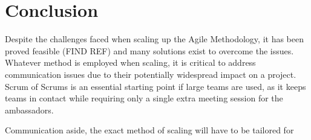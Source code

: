 \documentclass{scrartcl}
\begin{document}
\section{Conclusion}

Despite the challenges faced when scaling up the Agile Methodology, it has been proved feasible (FIND REF) and many solutions exist to overcome the issues. Whatever method is employed when scaling, it is critical to address communication issues due to their potentially widespread impact on a project. Scrum of Scrums is an essential starting point if large teams are used, as it keeps teams in contact while requiring only a single extra meeting session for the ambassadors.  

Communication aside, the exact method of scaling will have to be tailored for




\end{document}
